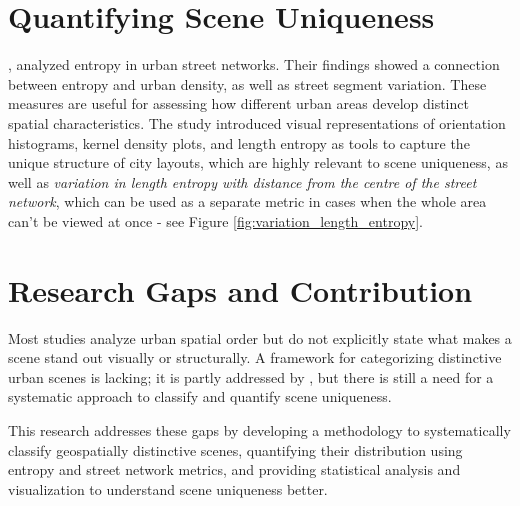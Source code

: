 \section{Quantifying Scene Uniqueness}
\citet{entropy2020}, analyzed entropy in urban street networks.
Their findings showed a connection between entropy and urban density, as well as street segment variation.
These measures are useful for assessing how different urban areas develop distinct spatial characteristics.
The study introduced visual representations of orientation histograms, kernel density plots,
and length entropy as tools to capture the unique structure of city layouts, 
which are highly relevant to scene uniqueness, as well as \textit{variation in length entropy 
with distance from the centre of the street network}, which can be used as a separate metric in cases
when the whole area can't be viewed at once - see Figure \ref{fig:variation_length_entropy}.


\section{Research Gaps and Contribution}
Most studies analyze urban spatial order but do not explicitly state what makes a scene stand out visually or structurally. A framework for categorizing distinctive urban scenes is lacking; it is partly addressed by \citet{entropy2020}, but there is still a need for a systematic approach to classify and quantify scene uniqueness.

This research addresses these gaps by developing a methodology to systematically classify geospatially distinctive scenes, quantifying their distribution using entropy and street network metrics, and providing statistical analysis and visualization to understand scene uniqueness better.
